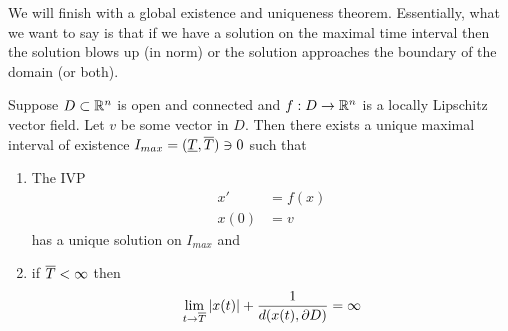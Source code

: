 We will finish with a global existence and uniqueness theorem. Essentially, what we want to say is that if we have a solution on the maximal time interval then the solution blows up (in norm) or the solution approaches the boundary of the domain (or both).
\begin{theorem}
Suppose $D \subset \mathbb{R}^n$ is open and connected and $f: D \to \mathbb{R}^n$ is a locally Lipschitz vector field. Let $v$ be some vector in $D$. Then there exists a unique maximal interval of existence $I_{max} = (\underline{T}, \overline{T}) \ni 0$ such that
\begin{enumerate}
    \item The IVP
    \begin{align*}
        x' &= f(x)\\
        x(0) &= v
    \end{align*}
    has a unique solution on $I_{max}$ and
    \item if $\overline{T} < \infty$ then
    $$ \lim_{t \to \overline{T}} |x(t)| + \frac{1}{d(x(t), \partial D)} = \infty $$
\end{enumerate}
\end{theorem}
